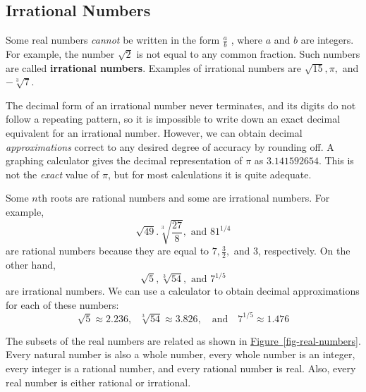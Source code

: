 \documentclass[10pt,]{book}
\newcommand{\terminology}[1]{\textbf{#1}}
\theoremstyle{plain}
\theoremstyle{definition}
\theoremstyle{definition}
\theoremstyle{definition}
\numberwithin{equation}{part}
\begin{document}
\subsection[{Irrational Numbers}]{Irrational Numbers}\label{subsection-61}
Some real numbers \emph{cannot} be written in the form \(\frac{a}{b} \) , where \(a\) and \(b\) are integers. For example, the number \(\sqrt{2} \) is not equal to any common fraction. Such numbers are called \terminology{irrational numbers}. Examples of irrational numbers are \(\sqrt{15}, \pi, \) and \(-\sqrt[3]{7} \).%
\par
The decimal form of an irrational number never terminates, and its digits do not follow a repeating pattern, so it is impossible to write down an exact decimal equivalent for an irrational number. However, we can obtain decimal \emph{approximations} correct to any desired degree of accuracy by rounding off. A graphing calculator gives the decimal representation of \(\pi\) as \(3.141592654\). This is not the \emph{exact} value of \(\pi\), but for most calculations it is quite adequate.%
\par
Some \(n\)th roots are rational numbers and some are irrational numbers. For example,%
\begin{equation*}
\sqrt{49}. \sqrt[3]{\frac{27}{8}}, \text{ and } 81^{1/4}
\end{equation*}
are rational numbers because they are equal to \(7, \frac{3}{2},\) and \(3\), respectively. On the other hand,%
\begin{equation*}
\sqrt{5}, \sqrt[3]{54}, \text{ and } 7^{1/5} 
\end{equation*}
are irrational numbers. We can use a calculator to obtain decimal approximations for each of these numbers:%
\begin{equation*}
\sqrt{5}\approx 2.236, ~~~\sqrt[3]{54}\approx 3.826, ~~~\text{ and }~~~ 7^{1/5}\approx 1.476 
\end{equation*}
%
\par
The subsets of the real numbers are related as shown in \hyperref[fig-real-numbers]{Figure~\ref{fig-real-numbers}}. Every natural number is also a whole number, every whole number is an integer, every integer is a rational number, and every rational number is real. Also, every real number is either rational or irrational. \leavevmode%
\end{document}
